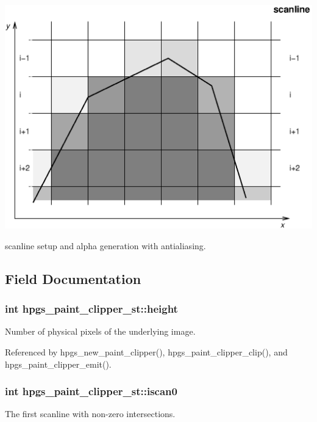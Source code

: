  
\begin{DoxyImage}
\includegraphics{scanline_n}
\caption{scanline setup and alpha generation with antialiasing.}
\end{DoxyImage}


\subsection{Field Documentation}
\subsubsection[{height}]{\setlength{\rightskip}{0pt plus 5cm}int {\bf hpgs\_\-paint\_\-clipper\_\-st::height}}\label{structhpgs__paint__clipper__st_a86d0fcb90e48b744eeb3ac6ffcb287ed}
Number of physical pixels of the underlying image. 

Referenced by hpgs\_\-new\_\-paint\_\-clipper(), hpgs\_\-paint\_\-clipper\_\-clip(), and hpgs\_\-paint\_\-clipper\_\-emit().

\subsubsection[{iscan0}]{\setlength{\rightskip}{0pt plus 5cm}int {\bf hpgs\_\-paint\_\-clipper\_\-st::iscan0}}\label{structhpgs__paint__clipper__st_a23f85f972d3629d30f8f032640d4b77e}
The first scanline with non-\/zero intersections. 

